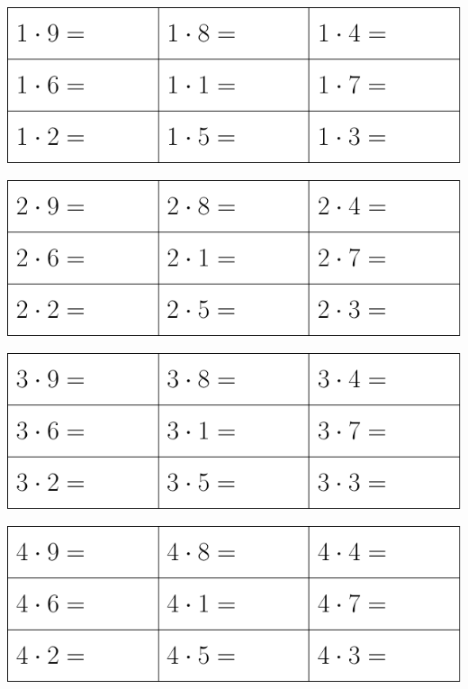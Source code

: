 \newpage
\thispagestyle{empty}
\begin{center}
	\includegraphics{g1}
\end{center}
\vspace{10pt}
\begin{center}
	\includegraphics{g2}
\end{center}
\vspace{10pt}
\begin{center}
	\includegraphics{g3}
\end{center}
\vspace{10pt}
\begin{center}
	\includegraphics{g4}
\end{center}
\vspace{10pt}

